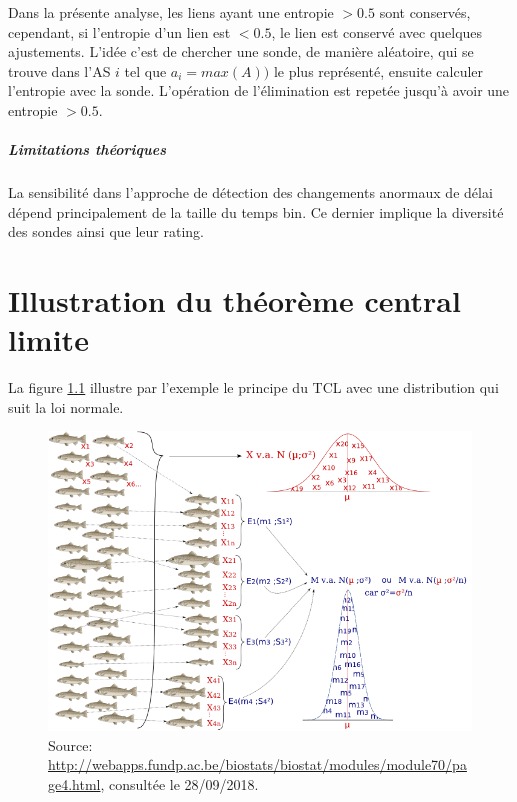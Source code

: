 \documentclass[]{report}
\newcommand{\source}[1]{\caption*{Source: {#1}} }
\begin{document}
Dans la présente analyse, les liens ayant une entropie $> 0.5$ sont conservés, cependant, si  l'entropie d'un lien est $< 0.5$, le lien est conservé avec quelques ajustements. L'idée c'est de chercher une sonde, de manière aléatoire, qui se trouve dans l'AS $i$ tel que $a_i = max (A))$ le plus représenté, ensuite calculer l'entropie avec la sonde. L'opération de l'élimination est repetée jusqu'à avoir une entropie $ > 0.5 $.



\paragraph{Limitations théoriques}

La sensibilité dans l'approche de détection des changements anormaux de délai dépend principalement de la taille du temps bin. Ce dernier implique la diversité des sondes ainsi que leur rating. 























\appendix

\chapter{Illustration du théorème central limite} \label{appendix:clt-exemple}
La figure \ref{fig:tcl} illustre par l'exemple le principe du TCL avec une distribution qui suit la loi normale. 
\begin{figure}[H]
	\centering
	\includegraphics[width=1\linewidth]{illustrations/tcl}
	\caption{}
	\label{fig:tcl}
	\source{\url{http://webapps.fundp.ac.be/biostats/biostat/modules/module70/page4.html}, consultée le 28/09/2018.}
	
\end{figure}
\end{document}
